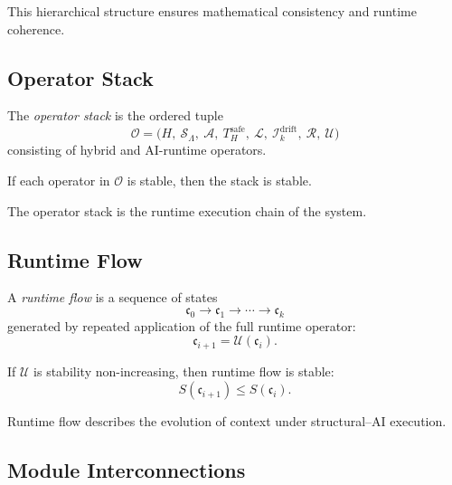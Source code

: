 \documentclass[11pt]{article}
\begin{document}
\begin{remark}
This hierarchical structure ensures mathematical consistency and runtime
coherence.
\end{remark}

\subsection{Operator Stack}

\begin{definition}
The \emph{operator stack} is the ordered tuple
\[
\mathcal{O}
= \big(
H,\ 
\mathcal{S}_\Lambda,\ 
\mathcal{A},\ 
T_H^\mathrm{safe},\ 
\mathcal{L},\ 
\mathcal{I}_k^\mathrm{drift},\ 
\mathcal{R},\ 
\mathcal{U}
\big)
\]
consisting of hybrid and AI-runtime operators.
\end{definition}

\begin{lemma}
If each operator in $\mathcal{O}$ is stable, then the stack is stable.
\end{lemma}

\begin{remark}
The operator stack is the runtime execution chain of the system.
\end{remark}

\subsection{Runtime Flow}

\begin{definition}
A \emph{runtime flow} is a sequence of states
\[
\mathfrak{c}_0 \to \mathfrak{c}_1 \to \cdots \to \mathfrak{c}_k
\]
generated by repeated application of the full runtime operator:
\[
\mathfrak{c}_{i+1} = \mathcal{U}(\mathfrak{c}_i).
\]
\end{definition}

\begin{lemma}
If $\mathcal{U}$ is stability non-increasing, then runtime flow is stable:
\[
S(\mathfrak{c}_{i+1}) \le S(\mathfrak{c}_i).
\]
\end{lemma}

\begin{remark}
Runtime flow describes the evolution of context under structural--AI
execution.
\end{remark}

\subsection{Module Interconnections}
\end{document}
